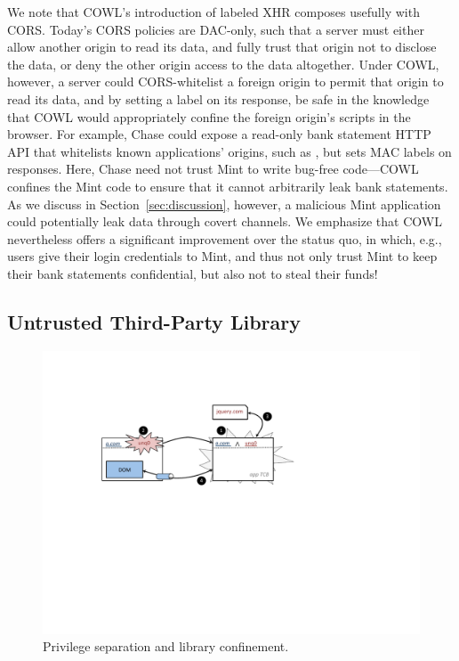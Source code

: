 We note that COWL's introduction of labeled XHR composes usefully with
CORS. Today's CORS policies are DAC-only, such that a server must
either allow another origin to read its data, and fully trust that
origin not to disclose the data, or deny the other origin access to
the data altogether. Under COWL, however, a server could
CORS-whitelist a foreign origin to permit that origin to read its
data, and by setting a label on its response, be safe in the knowledge
that COWL would appropriately confine the foreign origin's scripts in
the browser. For example, Chase could expose a read-only bank
statement HTTP API that whitelists known applications' origins, such
as , but sets MAC labels on responses. Here, Chase
need not trust Mint to write bug-free code---COWL confines the Mint
code to ensure that it cannot arbitrarily leak bank statements. As we
discuss in Section~\ref{sec:discussion}, however, a malicious Mint
application could potentially leak data through covert channels.  We
emphasize that COWL nevertheless offers a significant improvement over
the status quo, in which, e.g., users give their login credentials to
Mint, and thus not only trust Mint to keep their bank statements
confidential, but also not to steal their funds!

\subsection{Untrusted Third-Party Library}
\label{sec:apps-third-party}

\begin{figure}
\centerline{\includegraphics[width=\columnwidth]{jquery}}
\caption{\label{fig:jquery} Privilege separation and library
confinement.}
\end{figure}

